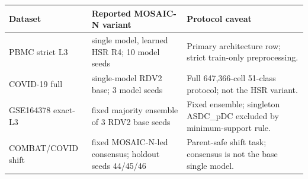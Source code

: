 \begin{tabularx}{\textwidth}{p{}p{}X}
\toprule
Dataset & Reported MOSAIC-N variant & Protocol caveat \\
\midrule
PBMC strict L3 & single model, learned HSR R4; 10 model seeds & Primary architecture row; strict train-only preprocessing. \\
COVID-19 full & single-model RDV2 base; 3 model seeds & Full 647,366-cell 51-class protocol; not the HSR variant. \\
GSE164378 exact-L3 & fixed majority ensemble of 3 RDV2 base seeds & Fixed ensemble; singleton ASDC\_pDC excluded by minimum-support rule. \\
COMBAT/COVID shift & fixed MOSAIC-N-led consensus; holdout seeds 44/45/46 & Parent-safe shift task; consensus is not the base single model. \\
\bottomrule
\end{tabularx}
